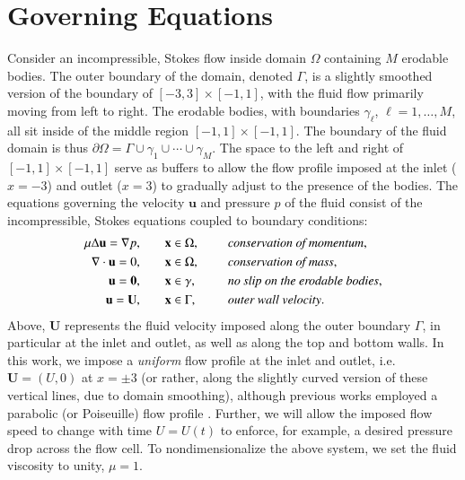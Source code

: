 \documentclass[3p]{elsarticle}
\newcommand{\bd}{{\partial}}
\newcommand{\grad}{{\nabla}}
\newcommand{\uu}{{\mathbf{u}}}
\newcommand{\UU}{{\mathbf{U}}}
\newcommand{\xx}{{\mathbf{x}}}
\def\gap{\hspace*{.2in}}
\begin{document}
\section{Governing Equations}
\label{sec:formulation}

Consider an incompressible, Stokes flow inside domain $\Omega$ containing $M$ erodable bodies. The outer boundary of the domain, denoted $\Gamma$, is a slightly smoothed version of the boundary of $[-3,3] \times [-1,1]$, with the fluid flow primarily moving from left to right. The erodable bodies, with boundaries $\gamma_\ell$, $\ell = 1,\ldots,M$, all sit inside of the middle region $[-1,1] \times [-1,1]$. The boundary of the fluid domain is thus $\bd \Omega = \Gamma \cup \gamma_1 \cup \cdots \cup \gamma_M$. The space to the left and right of $[-1,1] \times [-1,1]$ serve as buffers to allow the flow profile imposed at the inlet ($x=-3$) and outlet ($x=3$) to gradually adjust to the presence of the bodies. The equations governing the velocity $\uu$ and pressure $p$ of the fluid consist of the incompressible, Stokes equations coupled to boundary conditions:
\begin{equation}
\label{eqn:StokesEq}
  \begin{split}
    \mu \Delta \uu = \grad p, &\hspace{20pt} \xx \in \Omega, \gap 
      &&\mbox{\em conservation of momentum}, \\
    \grad \cdot \uu = 0, &\hspace{20pt} \xx \in \Omega, \gap 
      &&\mbox{\em conservation of mass}, \\
    \uu = \mathbf{0}, &\hspace{20pt} \xx \in \gamma, \gap 
      &&\mbox{\em no slip on the erodable bodies}, \\
    \uu = \UU, &\hspace{20pt} \xx \in \Gamma, \gap 
      &&\mbox{\em outer wall velocity}.
  \end{split}
\end{equation}
Above, $\UU$ represents the fluid velocity imposed along the outer boundary $\Gamma$, in particular at the inlet and outlet, as well as along the top and bottom walls. In this work, we impose a {\em uniform} flow profile at the inlet and outlet, i.e.~$\UU = (U,0)$ at $x=\pm 3$ (or rather, along the slightly curved version of these vertical lines, due to domain smoothing), although previous works employed a parabolic (or Poiseuille) flow profile \cite{Quaife2018, chiu2020viscous}. 
Further, we will allow the imposed flow speed to change with time $U = U(t)$ to enforce, for example, a desired pressure drop across the flow cell. To nondimensionalize the above system, we set the fluid viscosity to unity, $\mu = 1$.
\end{document}

